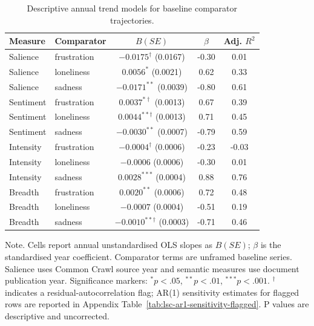 \begin{table}[htbp]
\centering
\caption{Descriptive annual trend models for baseline comparator trajectories.}
\label{tab:lsc-regression-baseline-comparators}
\small
\begin{tabular}{@{}llccc@{}}
\toprule
Measure & Comparator & $B(SE)$ & $\beta$ & Adj. $R^2$ \\
\midrule
Salience & frustration & $-0.0175^{\dagger}$ (0.0167) & -0.30 & 0.01 \\
Salience & loneliness & $0.0056^{*}$ (0.0021) & 0.62 & 0.33 \\
Salience & sadness & $-0.0171^{**}$ (0.0039) & -0.80 & 0.61 \\
Sentiment & frustration & $0.0037^{*\dagger}$ (0.0013) & 0.67 & 0.39 \\
Sentiment & loneliness & $0.0044^{**\dagger}$ (0.0013) & 0.71 & 0.45 \\
Sentiment & sadness & $-0.0030^{**}$ (0.0007) & -0.79 & 0.59 \\
Intensity & frustration & $-0.0004^{\dagger}$ (0.0006) & -0.23 & -0.03 \\
Intensity & loneliness & $-0.0006$ (0.0006) & -0.30 & 0.01 \\
Intensity & sadness & $0.0028^{***}$ (0.0004) & 0.88 & 0.76 \\
Breadth & frustration & $0.0020^{**}$ (0.0006) & 0.72 & 0.48 \\
Breadth & loneliness & $-0.0007$ (0.0004) & -0.51 & 0.19 \\
Breadth & sadness & $-0.0010^{**\dagger}$ (0.0003) & -0.71 & 0.46 \\
\bottomrule
\end{tabular}
\parbox{\linewidth}{\footnotesize Note. Cells report annual unstandardised OLS slopes as $B(SE)$; $\beta$ is the standardised year coefficient. Comparator terms are unframed baseline series. Salience uses Common Crawl source year and semantic measures use document publication year. Significance markers: $^{*}p<.05$, $^{**}p<.01$, $^{***}p<.001$. $^{\dagger}$ indicates a residual-autocorrelation flag; AR(1) sensitivity estimates for flagged rows are reported in Appendix Table~\ref{tab:lsc-ar1-sensitivity-flagged}. P values are descriptive and uncorrected.}
\end{table}
